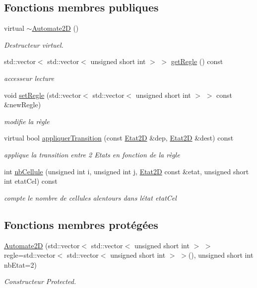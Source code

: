 \subsection*{Fonctions membres publiques}
\begin{DoxyCompactItemize}
\item 
virtual \hyperlink{class_automate2_d_a20624efccdb4ec55afe6259f51ce3dd2}{$\sim$\+Automate2D} ()
\begin{DoxyCompactList}\small\item\em Destructeur virtuel. \end{DoxyCompactList}\item 
std\+::vector$<$ std\+::vector$<$ unsigned short int $>$ $>$ \hyperlink{class_automate2_d_a0140faf046124a3d6c1792ca8493f60b}{get\+Regle} () const 
\begin{DoxyCompactList}\small\item\em accesseur lecture \end{DoxyCompactList}\item 
void \hyperlink{class_automate2_d_a250f624adbe858ecbb17784730845248}{set\+Regle} (std\+::vector$<$ std\+::vector$<$ unsigned short int $>$ $>$ const \&new\+Regle)
\begin{DoxyCompactList}\small\item\em modifie la règle \end{DoxyCompactList}\item 
virtual bool \hyperlink{class_automate2_d_a2cc86edfb8c2ec56a645247449b94c16}{appliquer\+Transition} (const \hyperlink{class_etat2_d}{Etat2D} \&dep, \hyperlink{class_etat2_d}{Etat2D} \&dest) const 
\begin{DoxyCompactList}\small\item\em applique la transition entre 2 Etats en fonction de la règle \end{DoxyCompactList}\item 
int \hyperlink{class_automate2_d_a067188a9e1b3afc554fc195e20cd60e8}{nb\+Cellule} (unsigned int i, unsigned int j, \hyperlink{class_etat2_d}{Etat2D} const \&etat, unsigned short int etat\+Cel) const 
\begin{DoxyCompactList}\small\item\em compte le nombre de cellules alentours dans l\textquotesingle{}état etat\+Cel \end{DoxyCompactList}\end{DoxyCompactItemize}
\subsection*{Fonctions membres protégées}
\begin{DoxyCompactItemize}
\item 
\hyperlink{class_automate2_d_ae00c4fae1c73cbac83424d576cfbd23d}{Automate2D} (std\+::vector$<$ std\+::vector$<$ unsigned short int $>$ $>$ regle=std\+::vector$<$ std\+::vector$<$ unsigned short int $>$ $>$(), unsigned short int nb\+Etat=2)
\begin{DoxyCompactList}\small\item\em Constructeur Protected. \end{DoxyCompactList}\end{DoxyCompactItemize}
